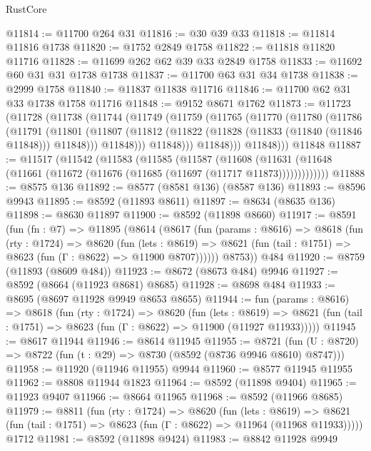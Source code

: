 \begin{lexlean}{RustCore}
\begin{coremodule}
@11814 := @11700 @264 @31
@11816 := @30 @39 @33
@11818 := @11814 @11816 @1738
@11820 := @1752 @2849 @1758
@11822 := @11818 @11820 @11716
@11828 := @11699 @262 @62 @39 @33 @2849 @1758
@11833 := @11692 @60 @31 @31 @1738 @1738
@11837 := @11700 @63 @31 @34 @1738
@11838 := @2999 @1758
@11840 := @11837 @11838 @11716
@11846 := @11700 @62 @31 @33 @1738 @1758 @11716
@11848 := @9152 @8671 @1762
@11873 := @11723
    (@11728
      (@11738
        (@11744
          (@11749
            (@11759
              (@11765
                (@11770
                  (@11780
                    (@11786
                      (@11791
                        (@11801
                          (@11807
                            (@11812 (@11822 (@11828 (@11833 (@11840 (@11846 @11848))) @11848)))
                            @11848)))
                      @11848)))
                @11848)))
          @11848)))
    @11848
@11887 := @11517
    (@11542
      (@11583
        (@11585
          (@11587
            (@11608
              (@11631 (@11648 (@11661 (@11672 (@11676 (@11685 (@11697 (@11717 @11873)))))))))))))
@11888 := @8575 @136
@11892 := @8577 (@8581 @136) (@8587 @136)
@11893 := @8596 @9943
@11895 := @8592 (@11893 @8611)
@11897 := @8634 (@8635 @136)
@11898 := @8630 @11897
@11900 := @8592 (@11898 @8660)
@11917 := @8591
    (fun (fn : @7) =>
    @11895
      (@8614
        (@8617
          (fun (params : @8616) =>
          @8618
            (fun (rty : @1724) =>
            @8620
              (fun (lets : @8619) =>
              @8621 (fun (tail : @1751) => @8623 (fun (Γ : @8622) => @11900 @8707))))))
        @8753))
    @484
@11920 := @8759 (@11893 (@8609 @484))
@11923 := @8672 (@8673 @484) @9946
@11927 := @8592 (@8664 (@11923 @8681) @8685)
@11928 := @8698 @484
@11933 := @8695 (@8697 @11928 @9949 @8653 @8655)
@11944 := fun (params : @8616) =>
  @8618
    (fun (rty : @1724) =>
    @8620
      (fun (lets : @8619) =>
      @8621 (fun (tail : @1751) => @8623 (fun (Γ : @8622) => @11900 (@11927 @11933)))))
@11945 := @8617 @11944
@11946 := @8614 @11945
@11955 := @8721
    (fun (U : @8720) => @8722 (fun (t : @29) => @8730 (@8592 (@8736 @9946 @8610) @8747)))
@11958 := @11920 (@11946 @11955) @9944
@11960 := @8577 @11945 @11955
@11962 := @8808 @11944 @1823
@11964 := @8592 (@11898 @9404)
@11965 := @11923 @9407
@11966 := @8664 @11965
@11968 := @8592 (@11966 @8685)
@11979 := @8811
    (fun (rty : @1724) =>
    @8620
      (fun (lets : @8619) =>
      @8621 (fun (tail : @1751) => @8623 (fun (Γ : @8622) => @11964 (@11968 @11933)))))
    @1712
@11981 := @8592 (@11898 @9424)
@11983 := @8842 @11928 @9949

\end{coremodule}
\end{lexlean}
